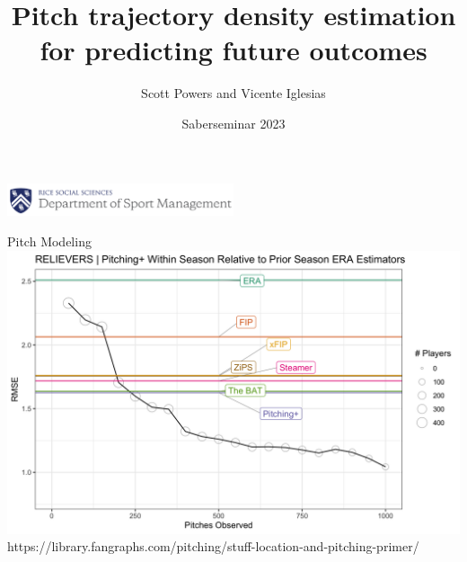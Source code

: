\documentclass{beamer}
\title{Pitch trajectory density estimation \\ for predicting future outcomes}
\author{\color{ricerichblue} Scott Powers and Vicente Iglesias}
\date{Saberseminar 2023}
\begin{document}
  \begin{frame}
    \maketitle
    \vfill
    \hfill
    \includegraphics[width = 0.5\textwidth]{images/rice_smgt.png}
  \end{frame}

  \begin{frame}{Pitch Modeling}
    \includegraphics[width = \textwidth]{images/pitching_plus.png}\\
    \color{ricegray} \footnotesize https://library.fangraphs.com/pitching/stuff-location-and-pitching-primer/
  \end{frame}
\end{document}
